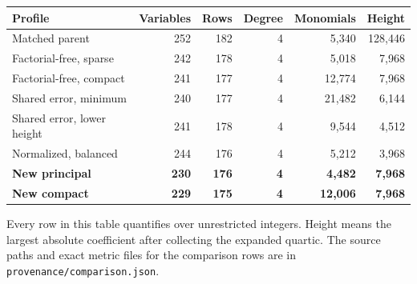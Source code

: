 \begin{center}\small
\begin{tabular}{@{}lrrrrr@{}}
\toprule
Profile & Variables & Rows & Degree & Monomials & Height \\
\midrule
Matched parent & 252 & 182 & 4 & 5,340 & 128,446 \\
Factorial-free, sparse & 242 & 178 & 4 & 5,018 & 7,968 \\
Factorial-free, compact & 241 & 177 & 4 & 12,774 & 7,968 \\
Shared error, minimum & 240 & 177 & 4 & 21,482 & 6,144 \\
Shared error, lower height & 241 & 178 & 4 & 9,544 & 4,512 \\
Normalized, balanced & 244 & 176 & 4 & 5,212 & 3,968 \\
\midrule
\textbf{New principal} & \textbf{230} & \textbf{176} & \textbf{4} & \textbf{4,482} & \textbf{7,968} \\
\textbf{New compact} & \textbf{229} & \textbf{175} & \textbf{4} & \textbf{12,006} & \textbf{7,968} \\
\bottomrule
\end{tabular}
\end{center}
Every row in this table quantifies over unrestricted integers.
Height means the largest absolute coefficient after collecting the expanded quartic.
The source paths and exact metric files for the comparison rows are in \nolinkurl{provenance/comparison.json}.
